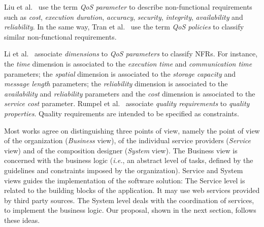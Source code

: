 Liu et al.~\cite{Liu20121080} use the term \textit{QoS parameter} to describe non-functional requirements such as \textit{cost}, \textit{execution duration}, \textit{accuracy}, \textit{security}, \textit{integrity}, \textit{availability} and \textit{reliability}.  
In the same way, Tran et al.~\cite{Tran2012531} use the term \textit{QoS policies} to classify similar non-functional requirements.

Li et al.~\cite{Li2013} associate \textit{dimensions} to  \textit{QoS parameters} to classify NFRs.  
For instance, the \textit{time} dimension is associated to the \textit{execution time} and \textit{communication time} parameters; the \textit{spatial} dimension is associated to the \textit{storage capacity} and \textit{message length} parameters; the \textit{reliability} dimension is associated to the \textit{availability} and \textit{reliability} parameters and the \textit{cost} dimension is associated to the \textit{service cost} parameter.
Rumpel et al.~\cite{Rumpel2012}  associate \textit{quality requirements} to  \textit{quality properties}. Quality requirements are intended to be specified as constraints. 

\bigskip
Most works agree on distinguishing three points of view, namely the point of view of the organization (\textit{Business} view), of the individual service providers (\textit{Service} view) and of the composition designer (\textit{System} view).
The Business view is concerned with the business logic (\textit{i.e.}, an abstract level of tasks, defined by the guidelines and constraints imposed by the organization).
Service and System views guides the implementation of the software solution: The Service level is related to the building blocks of the application.
It may use web services provided by third party sources.
The System level deals with the coordination of services, to implement the business logic.
Our proposal, shown in the next section, follows these ideas.